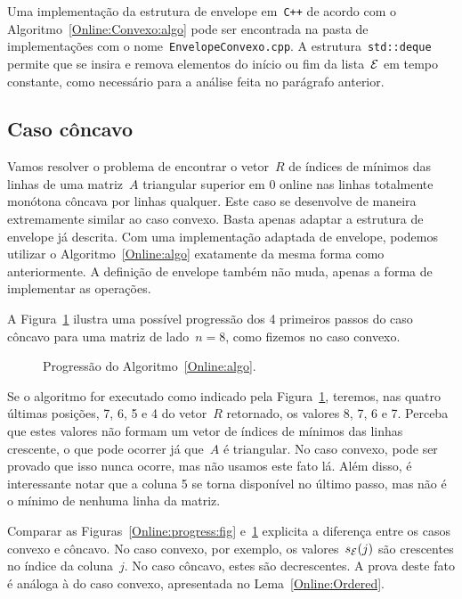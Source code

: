 Uma implementação da estrutura de envelope em~\texttt{C++} de acordo com o Algoritmo~\ref{Online:Convexo:algo} pode ser encontrada na pasta de implementações com o nome~\texttt{EnvelopeConvexo.cpp}. A estrutura~\texttt{std::deque} permite que se insira e remova elementos do início ou fim da lista~$\mathcal{E}$ em tempo constante, como necessário para a análise feita no parágrafo anterior.


\subsection{Caso côncavo} \label{Online:concave}

Vamos resolver o problema de encontrar o vetor~$R$ de índices de mínimos das linhas de uma matriz~$A$ triangular superior em 0 online nas linhas totalmente monótona côncava por linhas qualquer. Este caso se desenvolve de maneira extremamente similar ao caso convexo. Basta apenas adaptar a estrutura de envelope já descrita. Com uma implementação adaptada de envelope, podemos utilizar o Algoritmo~\ref{Online:algo} exatamente da mesma forma como anteriormente. A definição de envelope também não muda, apenas a forma de implementar as operações.

A Figura~\ref{Online:progressConcave:fig} ilustra uma possível progressão dos 4 primeiros passos do caso côncavo para uma matriz de lado~${n=8}$, como fizemos no caso convexo.

\begin{figure}[h]
    \centering
    
    \caption{Progressão do Algoritmo~\ref{Online:algo}.} \label{Online:progressConcave:fig}
\end{figure}

Se o algoritmo for executado como indicado pela Figura~\ref{Online:progressConcave:fig}, teremos, nas quatro últimas posições, 7, 6, 5 e 4 do vetor~$R$ retornado, os valores 8, 7, 6 e 7. Perceba que estes valores não formam um vetor de índices de mínimos das linhas crescente, o que pode ocorrer já que~$A$ é triangular. No caso convexo, pode ser provado que isso nunca ocorre, mas não usamos este fato lá. Além disso, é interessante notar que a coluna 5 se torna disponível no último passo, mas não é o mínimo de nenhuma linha da matriz. 

Comparar as Figuras~\ref{Online:progress:fig} e~\ref{Online:progressConcave:fig} explicita a diferença entre os casos convexo e côncavo. No caso convexo, por exemplo, os valores~$s_{\mathcal{E}}(j)$ são crescentes no índice da coluna~$j$. No caso côncavo, estes são decrescentes. A prova deste fato é análoga à do caso convexo, apresentada no Lema~\ref{Online:Ordered}.

